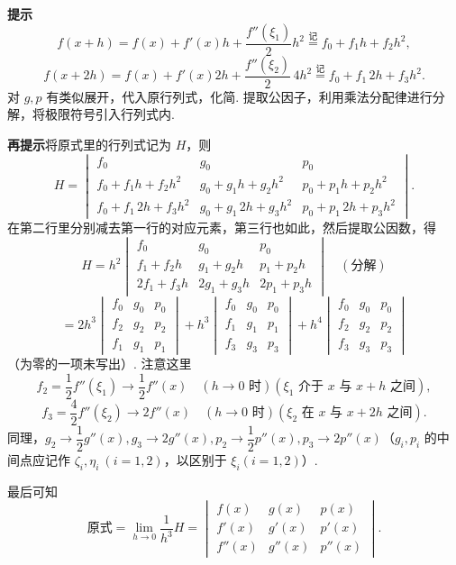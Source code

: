 \documentclass[UTF8,12pt,a4paper,fontset=fandol]{ctexart}
\begin{document}
\noindent\textbf{提示}\quad
\[
  f(x+h)=f(x)+f'(x)h+\frac{f''(\xi_1)}2h^2\overset{\text{记}}{=}f_0+f_1h+f_2h^2,
\]
\[
  f(x+2h)=f(x)+f'(x)2h+\frac{f''(\xi_2)}2\,4h^2
  \overset{\text{记}}{=}f_0+f_1\,2h+f_3h^2.
\]
对 $g,p$ 有类似展开，代入原行列式，化简. 提取公因子，利用乘法分配律进行分解，将极限符号引入行列式内.

\noindent\textbf{再提示}\quad 将原式里的行列式记为 $H$，则
\[
  H=
  \begin{vmatrix}
  f_0&g_0&p_0\\
  f_0+f_1h+f_2h^2&g_0+g_1h+g_2h^2&p_0+p_1h+p_2h^2\\
  f_0+f_1\,2h+f_3h^2&g_0+g_1\,2h+g_3h^2&p_0+p_1\,2h+p_3h^2
  \end{vmatrix}.
\]
在第二行里分别减去第一行的对应元素，第三行也如此，然后提取公因数，得
\[
  H=h^2
  \begin{vmatrix}
  f_0&g_0&p_0\\
  f_1+f_2h&g_1+g_2h&p_1+p_2h\\
  2f_1+f_3h&2g_1+g_3h&2p_1+p_3h
  \end{vmatrix}\quad(\text{分解})
\]
\[
  =2h^3
  \begin{vmatrix}
  f_0&g_0&p_0\\
  f_2&g_2&p_2\\
  f_1&g_1&p_1
  \end{vmatrix}
  +h^3
  \begin{vmatrix}
  f_0&g_0&p_0\\
  f_1&g_1&p_1\\
  f_3&g_3&p_3
  \end{vmatrix}
  +h^4
  \begin{vmatrix}
  f_0&g_0&p_0\\
  f_2&g_2&p_2\\
  f_3&g_3&p_3
  \end{vmatrix}
\]
（为零的一项未写出）. 注意这里
\[
  f_2=\frac12f''(\xi_1)\to\frac12f''(x)\quad(h\to0\text{ 时})(\xi_1\text{ 介于 }x\text{ 与 }x+h\text{ 之间}),
\]
\[
  f_3=\frac42f''(\xi_2)\to2f''(x)\quad(h\to0\text{ 时})(\xi_2\text{ 在 }x\text{ 与 }x+2h\text{ 之间}).
\]
同理，$g_2\to\dfrac12g''(x),g_3\to2g''(x),p_2\to\dfrac12p''(x),p_3\to2p''(x)$（$g_i,p_i$ 的中间点应记作 $\zeta_i,\eta_i\ (i=1,2)$，以区别于 $\xi_i(i=1,2)$）.

最后可知
\[
  \text{原式}=\lim_{h\to0}\frac1{h^3}H=
  \begin{vmatrix}
  f(x)&g(x)&p(x)\\
  f'(x)&g'(x)&p'(x)\\
  f''(x)&g''(x)&p''(x)
  \end{vmatrix}.
\]
\end{document}
